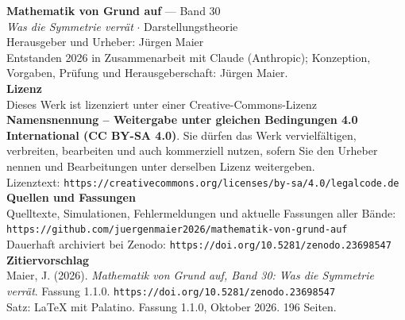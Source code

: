 \thispagestyle{empty}
\vspace*{\fill}
\begin{flushleft}
{\small\color{grau}
\textbf{\color{tief}Mathematik von Grund auf} --- Band 30\\[2pt]
\textit{Was die Symmetrie verrät} $\cdot$ Darstellungstheorie\\[14pt]

Herausgeber und Urheber: Jürgen Maier\\[2pt]
Entstanden 2026 in Zusammenarbeit mit Claude (Anthropic); Konzeption, Vorgaben, Prüfung und Herausgeberschaft: Jürgen Maier.\\[14pt]

\textbf{Lizenz}\\[2pt]
Dieses Werk ist lizenziert unter einer Creative-Commons-Lizenz \textbf{Namensnennung -- Weitergabe unter gleichen Bedingungen 4.0 International (CC BY-SA 4.0)}. Sie dürfen das Werk vervielfältigen, verbreiten, bearbeiten und auch kommerziell nutzen, sofern Sie den Urheber nennen und Bearbeitungen unter derselben Lizenz weitergeben.\\[2pt]
Lizenztext: \texttt{https://creativecommons.org/licenses/by-sa/4.0/legalcode.de}\\[14pt]

\textbf{Quellen und Fassungen}\\[2pt]
Quelltexte, Simulationen, Fehlermeldungen und aktuelle Fassungen aller Bände:\\
\texttt{https://github.com/juergenmaier2026/mathematik-von-grund-auf}\\[2pt]
Dauerhaft archiviert bei Zenodo: \texttt{https://doi.org/10.5281/zenodo.23698547}\\[14pt]

\textbf{Zitiervorschlag}\\[2pt]
Maier, J. (2026). \textit{Mathematik von Grund auf, Band 30: Was die Symmetrie verrät}. Fassung 1.1.0. \texttt{https://doi.org/10.5281/zenodo.23698547}\\[14pt]

Satz: \LaTeX{} mit Palatino. Fassung 1.1.0, Oktober 2026. 196 Seiten.
}
\end{flushleft}
\vspace*{1.5cm}
